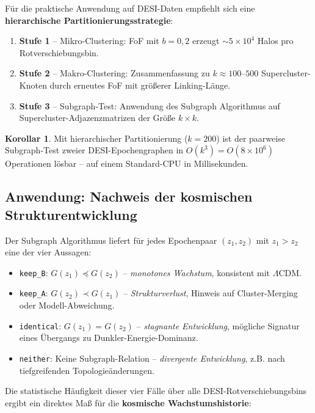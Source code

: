 ﻿\documentclass[a4paper,12pt]{article}
\theoremstyle{definition}
\newtheorem{korollar}{Korollar}[section]
\theoremstyle{remark}
\begin{document}
Für die praktische Anwendung auf DESI-Daten empfiehlt sich eine
\textbf{hierarchische Partitionierungsstrategie}:

\begin{enumerate}[label=\arabic*.]
  \item \textbf{Stufe 1} -- Mikro-Clustering: FoF mit $b=0{,}2$ erzeugt
    $\sim 5 \times 10^4$ Halos pro Rotverschiebungsbin.
  \item \textbf{Stufe 2} -- Makro-Clustering: Zusammenfassung zu
    $k \approx 100$--$500$ Supercluster-Knoten durch erneutes FoF
    mit größerer Linking-Länge.
  \item \textbf{Stufe 3} -- Subgraph-Test: Anwendung des Subgraph Algorithmus
    auf Supercluster-Adjazenzmatrizen der Größe $k \times k$.
\end{enumerate}

\begin{korollar}
  Mit hierarchischer Partitionierung ($k = 200$) ist der paarweise Subgraph-Test
  zweier DESI-Epochengraphen in $O(k^3) = O(8 \times 10^6)$ Operationen
  lösbar -- auf einem Standard-CPU in Millisekunden.
\end{korollar}

\subsection{Anwendung: Nachweis der kosmischen Strukturentwicklung}

Der Subgraph Algorithmus liefert für jedes Epochenpaar $(z_1, z_2)$ mit
$z_1 > z_2$ eine der vier Aussagen:

\begin{itemize}
  \item \texttt{keep\_B}: $G(z_1) \preceq G(z_2)$ -- \textit{monotones Wachstum},
    konsistent mit $\Lambda$CDM.
  \item \texttt{keep\_A}: $G(z_2) \prec G(z_1)$ -- \textit{Strukturverlust},
    Hinweis auf Cluster-Merging oder Modell-Abweichung.
  \item \texttt{identical}: $G(z_1) = G(z_2)$ -- \textit{stagnante Entwicklung},
    mögliche Signatur eines Übergangs zu Dunkler-Energie-Dominanz.
  \item \texttt{neither}: Keine Subgraph-Relation -- \textit{divergente Entwicklung},
    z.B. nach tiefgreifenden Topologieänderungen.
\end{itemize}

Die statistische Häufigkeit dieser vier Fälle über alle DESI-Rotverschiebungsbins
ergibt ein direktes Maß für die \textbf{kosmische Wachstumshistorie}:
\end{document}
